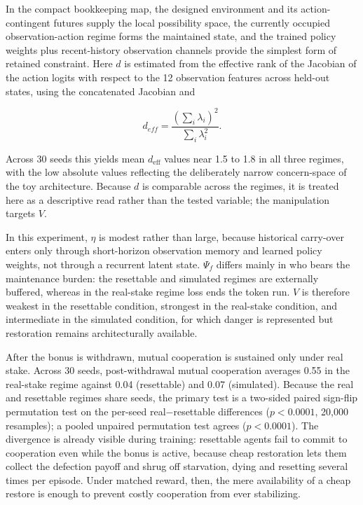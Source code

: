 \documentclass[Afour,sageh,times,doublespace]{sagej}
\begin{document}
In the compact bookkeeping map, the designed environment and its action-contingent futures supply the local possibility space, the currently occupied observation-action regime forms the maintained state, and the trained policy weights plus recent-history observation channels provide the simplest form of retained constraint. Here \(d\) is estimated from the effective rank of the Jacobian of the action logits with respect to the 12 observation features across held-out states, using the concatenated Jacobian and

\[
d_{eff} = \frac{\left(\sum_i \lambda_i\right)^2}{\sum_i \lambda_i^2}.
\]

Across 30 seeds this yields mean \(d_{\mathrm{eff}}\) values near 1.5 to 1.8 in all three regimes, with the low absolute values reflecting the deliberately narrow concern-space of the toy architecture. Because \(d\) is comparable across the regimes, it is treated here as a descriptive read rather than the tested variable; the manipulation targets \(V\).

In this experiment, \(\eta\) is modest rather than large, because historical carry-over enters only through short-horizon observation memory and learned policy weights, not through a recurrent latent state. \(\Psi_f\) differs mainly in who bears the maintenance burden: the resettable and simulated regimes are externally buffered, whereas in the real-stake regime loss ends the token run. \(V\) is therefore weakest in the resettable condition, strongest in the real-stake condition, and intermediate in the simulated condition, for which danger is represented but restoration remains architecturally available.

After the bonus is withdrawn, mutual cooperation is sustained only under real stake. Across 30 seeds, post-withdrawal mutual cooperation averages 0.55 in the real-stake regime against 0.04 (resettable) and 0.07 (simulated). Because the real and resettable regimes share seeds, the primary test is a two-sided paired sign-flip permutation test on the per-seed real−resettable differences (\(p < 0.0001\), 20,000 resamples); a pooled unpaired permutation test agrees (\(p < 0.0001\)). The divergence is already visible during training: resettable agents fail to commit to cooperation even while the bonus is active, because cheap restoration lets them collect the defection payoff and shrug off starvation, dying and resetting several times per episode. Under matched reward, then, the mere availability of a cheap restore is enough to prevent costly cooperation from ever stabilizing.
\end{document}
